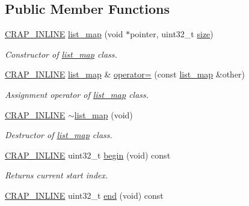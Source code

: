 \subsection*{Public Member Functions}
\begin{DoxyCompactItemize}
\item 
\hyperlink{config__x86_8h_a5a40526b8d842e7ff731509998bb0f1c}{C\+R\+A\+P\+\_\+\+I\+N\+L\+I\+N\+E} \hyperlink{classcrap_1_1list__map_a550d51e8a00b5a52208ec336ecd7724a}{list\+\_\+map} (void $\ast$pointer, uint32\+\_\+t \hyperlink{classcrap_1_1list__map_ae7b0bf2aa79b04cf3c7b884fd8a95a78}{size})
\begin{DoxyCompactList}\small\item\em Constructor of \hyperlink{classcrap_1_1list__map}{list\+\_\+map} class. \end{DoxyCompactList}\item 
\hyperlink{config__x86_8h_a5a40526b8d842e7ff731509998bb0f1c}{C\+R\+A\+P\+\_\+\+I\+N\+L\+I\+N\+E} \hyperlink{classcrap_1_1list__map}{list\+\_\+map} \& \hyperlink{classcrap_1_1list__map_ac1df8db7e0058c6f283f287e54921109}{operator=} (const \hyperlink{classcrap_1_1list__map}{list\+\_\+map} \&other)
\begin{DoxyCompactList}\small\item\em Assignment operator of \hyperlink{classcrap_1_1list__map}{list\+\_\+map} class. \end{DoxyCompactList}\item 
\hyperlink{config__x86_8h_a5a40526b8d842e7ff731509998bb0f1c}{C\+R\+A\+P\+\_\+\+I\+N\+L\+I\+N\+E} \hyperlink{classcrap_1_1list__map_afba9ce9045964f45887e0f9d83e2ee04}{$\sim$list\+\_\+map} (void)
\begin{DoxyCompactList}\small\item\em Destructor of \hyperlink{classcrap_1_1list__map}{list\+\_\+map} class. \end{DoxyCompactList}\item 
\hyperlink{config__x86_8h_a5a40526b8d842e7ff731509998bb0f1c}{C\+R\+A\+P\+\_\+\+I\+N\+L\+I\+N\+E} uint32\+\_\+t \hyperlink{classcrap_1_1list__map_a723e4909f8aa42d14c9bdd653295b502}{begin} (void) const 
\begin{DoxyCompactList}\small\item\em Returns current start index. \end{DoxyCompactList}\item 
\hyperlink{config__x86_8h_a5a40526b8d842e7ff731509998bb0f1c}{C\+R\+A\+P\+\_\+\+I\+N\+L\+I\+N\+E} uint32\+\_\+t \hyperlink{classcrap_1_1list__map_a2e1d0863854105dadcd9c261a46c46e4}{end} (void) const 

\end{DoxyCompactItemize}
